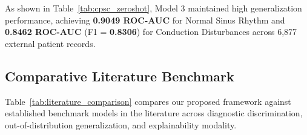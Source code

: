 \documentclass[5p,twocolumn,10pt]{elsarticle}
\begin{document}
\begin{table}[t]
\caption{Zero-Shot Benchmark Results on CPSC2018 Dataset (6,877 Records).}
\label{tab:cpsc_zeroshot}
\centering
\small
\setlength{\tabcolsep}{3.5pt}
\end{table}

As shown in Table~\ref{tab:cpsc_zeroshot}, Model 3 maintained high generalization performance, achieving \textbf{0.9049 ROC-AUC} for Normal Sinus Rhythm and \textbf{0.8462 ROC-AUC} (F1 = \textbf{0.8306}) for Conduction Disturbances across 6,877 external patient records.

\subsection{Comparative Literature Benchmark}
Table~\ref{tab:literature_comparison} compares our proposed framework against established benchmark models in the literature across diagnostic discrimination, out-of-distribution generalization, and explainability modality.
\end{document}
